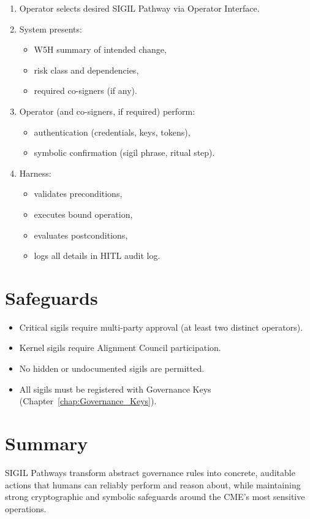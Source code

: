 \begin{enumerate}
    \item Operator selects desired SIGIL Pathway via Operator Interface.
    \item System presents:
    \begin{itemize}
        \item W5H summary of intended change,
        \item risk class and dependencies,
        \item required co-signers (if any).
    \end{itemize}
    \item Operator (and co-signers, if required) perform:
    \begin{itemize}
        \item authentication (credentials, keys, tokens),
        \item symbolic confirmation (sigil phrase, ritual step).
    \end{itemize}
    \item Harness:
    \begin{itemize}
        \item validates preconditions,
        \item executes bound operation,
        \item evaluates postconditions,
        \item logs all details in HITL audit log.
    \end{itemize}
\end{enumerate}

\section{Safeguards}

\begin{itemize}
    \item Critical sigils require multi-party approval (at least two distinct operators).
    \item Kernel sigils require Alignment Council participation.
    \item No hidden or undocumented sigils are permitted.
    \item All sigils must be registered with Governance Keys
          (Chapter~\ref{chap:Governance_Keys}).
\end{itemize}

\section{Summary}

SIGIL Pathways transform abstract governance rules into concrete, auditable actions
that humans can reliably perform and reason about, while maintaining strong
cryptographic and symbolic safeguards around the CME’s most sensitive operations.
